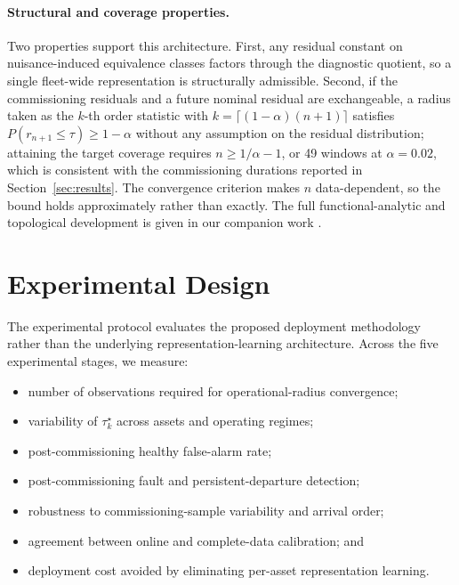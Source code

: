 \documentclass{trbunofficial}
\begin{document}
\paragraph{Structural and coverage properties.}
Two properties support this architecture. First, any residual constant on
nuisance-induced equivalence classes factors through the diagnostic quotient,
so a single fleet-wide representation is structurally admissible. Second, if
the commissioning residuals and a future nominal residual are exchangeable, a
radius taken as the $k$-th order statistic with
$k=\lceil(1-\alpha)(n+1)\rceil$ satisfies $P(r_{n+1}\le\tau)\ge 1-\alpha$
without any assumption on the residual distribution; attaining the target
coverage requires $n\ge 1/\alpha-1$, or 49 windows at $\alpha=0.02$, which is
consistent with the commissioning durations reported in
Section~\ref{sec:results}. The convergence criterion makes $n$ data-dependent,
so the bound holds approximately rather than exactly. The full
functional-analytic and topological development is given in our companion work
\citep{disanti2026quotient,disanti2026inverse}.

\section{Experimental Design}
\label{sec:experimental_design}

The experimental protocol evaluates the proposed deployment methodology rather
than the underlying representation-learning architecture. Across the five
experimental stages, we measure:

\begin{itemize}[leftmargin=1.5em]
    \item number of observations required for operational-radius convergence;
    \item variability of $\tau_k^\star$ across assets and operating regimes;
    \item post-commissioning healthy false-alarm rate;
    \item post-commissioning fault and persistent-departure detection;
    \item robustness to commissioning-sample variability and arrival order;
    \item agreement between online and complete-data calibration; and
    \item deployment cost avoided by eliminating per-asset representation learning.
\end{itemize}
\end{document}
